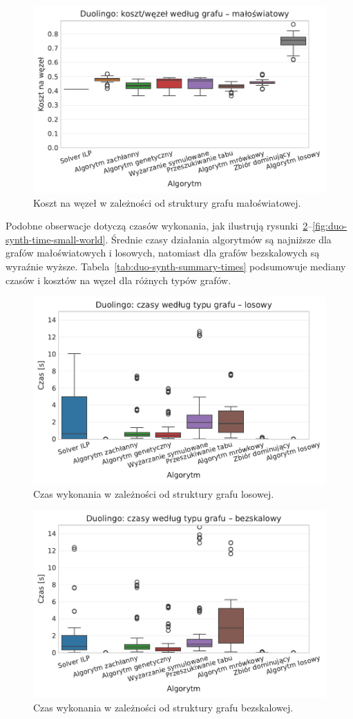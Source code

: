 \begin{figure}[H]
  \centering
  \includegraphics[width=0.65\linewidth]{assets/figures/benchmark/synthetic/duolingo_cost_per_node_by_graph_small_world.pdf}
  \caption{Koszt na węzeł w zależności od struktury grafu małoświatowej.}
  \label{fig:duo-synth-cost-small-world}
\end{figure}

Podobne obserwacje dotyczą czasów wykonania, jak ilustrują rysunki~\ref{fig:duo-synth-time-random}--\ref{fig:duo-synth-time-small-world}. Średnie czasy działania algorytmów są najniższe dla grafów małoświatowych i losowych, natomiast dla grafów bezskalowych są wyraźnie wyższe. Tabela~\ref{tab:duo-synth-summary-times} podsumowuje mediany czasów i kosztów na węzeł dla różnych typów grafów.



\begin{figure}[H]
  \centering
  \includegraphics[width=0.65\linewidth]{assets/figures/benchmark/synthetic/duolingo_time_by_graph_random.pdf}
  \caption{Czas wykonania w zależności od struktury grafu losowej.}
  \label{fig:duo-synth-time-random}
\end{figure}

\begin{figure}[H]
  \centering
  \includegraphics[width=0.65\linewidth]{assets/figures/benchmark/synthetic/duolingo_time_by_graph_scale_free.pdf}
  \caption{Czas wykonania w zależności od struktury grafu bezskalowej.}
  \label{fig:duo-synth-time-scale-free}
\end{figure}

